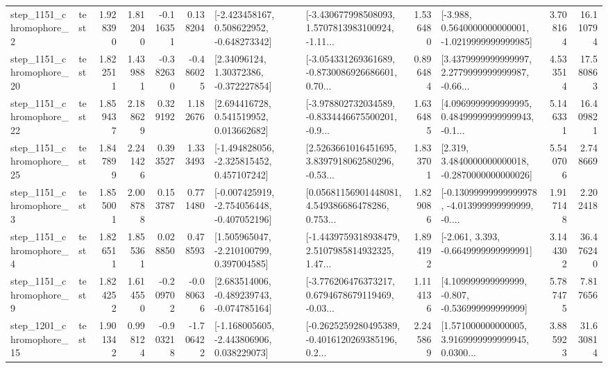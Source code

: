 \begin{tabular}{llrrrrllrlrr}
  step\_1151\_chromophore\_2 &      test &      1.928390 &    1.812040 &     -0.116351 &  0.138204 &   [-2.423458167, 0.508622952, -0.648273342] &  [-3.430677998508093, 1.5707813983100924, -1.11... &       1.536480 &  [-3.988, 0.5640000000000001, -1.0219999999999985] &            3.708164 &         16.110794 \\
 step\_1151\_chromophore\_20 &      test &      1.822511 &    1.439881 &     -0.382630 & -0.486025 &      [2.34096124, 1.30372386, -0.372227854] &  [-3.054331269361689, -0.8730086926686601, 0.70... &       0.896484 &  [3.4379999999999997, 2.2779999999999987, -0.66... &            4.533514 &         17.580863 \\
 step\_1151\_chromophore\_22 &      test &      1.859437 &    2.188629 &      0.329192 &  1.182676 &     [2.694416728, 0.541519952, 0.013662682] &  [-3.978802732034589, -0.8334446675500201, -0.9... &       1.636485 &  [4.0969999999999995, 0.48499999999999943, -0.1... &            5.146331 &         16.409821 \\
 step\_1151\_chromophore\_25 &      test &      1.847899 &    2.241426 &      0.393527 &  1.333493 &   [-1.494828056, -2.325815452, 0.457107242] &  [2.5263661016451695, 3.8397918062580296, -0.53... &       1.833701 &   [2.319, 3.4840000000000018, -0.2870000000000026] &            5.540706 &          2.748669 \\
  step\_1151\_chromophore\_3 &      test &      1.855001 &    2.008788 &      0.153787 &  0.771480 &  [-0.007425919, -2.754056448, -0.407052196] &  [0.05681156901448081, 4.549386686478286, 0.753... &       1.829086 &  [-0.13099999999999978, -4.013999999999999, -0.... &            1.917148 &          2.202418 \\
  step\_1151\_chromophore\_4 &      test &      1.826511 &    1.855361 &      0.028850 &  0.478593 &    [1.505965047, -2.210100799, 0.397004585] &  [-1.4439759318938479, 2.5107985814932325, 1.47... &       1.894192 &               [-2.061, 3.393, -0.6649999999999991] &            3.144302 &         36.476240 \\
  step\_1151\_chromophore\_9 &      test &      1.824252 &    1.614550 &     -0.209702 & -0.080636 &   [2.683514006, -0.489239743, -0.074785164] &  [-3.776206476373217, 0.6794678679119469, -0.03... &       1.114136 &    [4.109999999999999, -0.807, -0.536999999999999] &            5.787475 &          7.817656 \\
 step\_1201\_chromophore\_15 &      test &      1.901342 &    0.998124 &     -0.903218 & -1.706422 &   [-1.168005605, -2.443806906, 0.038229073] &  [-0.2625259280495389, -0.4016120269385196, 0.2... &       2.245869 &  [1.571000000000005, 3.9169999999999945, 0.0300... &            3.885923 &         31.630814 \\

\end{tabular}
